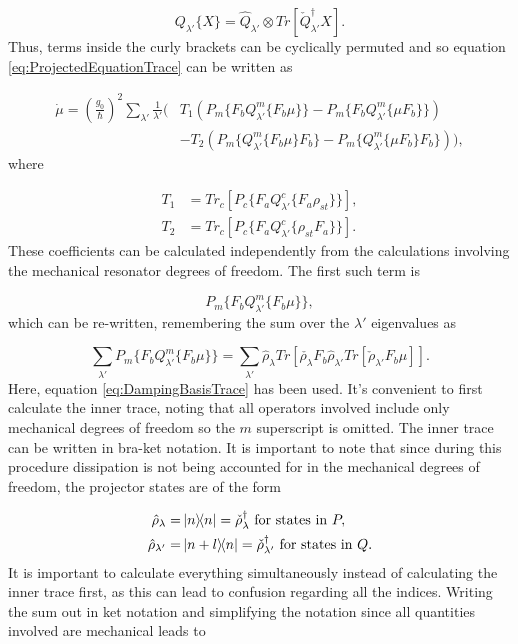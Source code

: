 \documentclass[12pt]{article}
\begin{document}
\begin{equation}\label{eq:DampingBasisTrace}
    Q_{\lambda'}\{X\} = \hat{Q}_{\lambda'}\otimes Tr[\check{Q}^\dagger_{\lambda'}X].
\end{equation} Thus, terms inside the curly brackets can be cyclically permuted and so equation \eqref{eq:ProjectedEquationTrace} can be written as

\begin{align*}
    \dot{\mu} = (\frac{g_0 }{\hbar})^2 \sum_{\lambda'}\frac{1}{\lambda'}\Bigg(& T_1(P_m\{F_b Q^m_{\lambda'}\{F_b\mu\}\}-P_m\{F_b Q^m_{\lambda'}\{\mu F_b\}\})\\
    &-T_2(P_m\{Q^m_{\lambda'}\{F_b\mu\}F_b\}-P_m\{Q^m_{\lambda'}\{\mu F_b\}F_b\})\Bigg),
\end{align*} where

\begin{align}
    T_1 &= Tr_c[P_c\{F_a Q^c_{\lambda'}\{F_a \rho_{st}\}\}],\\
    T_2 &= Tr_c[P_c\{F_aQ^c_{\lambda'}\{\rho_{st}F_a \} \}].
\end{align} These coefficients can be calculated independently from the calculations involving the mechanical resonator degrees of freedom. The first such term is

$$
    P_m\{F_b Q^m_{\lambda'}\{F_b\mu\}\},
$$
which can be re-written, remembering the sum over the $\lambda'$ eigenvalues as

\begin{equation}
  \sum_{\lambda'}  P_m\{F_b Q^m_{\lambda'}\{F_b\mu\}\} = \sum_{\lambda'} \hat{\rho}_\lambda Tr[\check{\rho_\lambda} F_b \hat{\rho}_{\lambda'}Tr[\check{\rho}_{\lambda'}F_b \mu] ].
\end{equation} Here, equation \eqref{eq:DampingBasisTrace} has been used. It's convenient to first calculate the inner trace, noting that all operators involved include only mechanical degrees of freedom so the $m$ superscript is omitted. The inner trace can be written in bra-ket notation. It is important to note that since during this procedure dissipation is not being accounted for in the mechanical degrees of freedom, the projector states are of the form

\begin{align}
    \hat{\rho}_\lambda =& \ketbra{n}{n} = \check{\rho}_\lambda^\dagger\text{ for states in } P,\\
    \hat{\rho}_{\lambda'} =& \ketbra{n+l}{n}= \check{\rho}_{\lambda'}^\dagger\text{ for states in } Q.
\end{align} It is important to calculate everything simultaneously instead of calculating the inner trace first, as this can lead to confusion regarding all the indices. Writing the sum out in ket notation and simplifying the notation since all quantities involved are mechanical leads to
\end{document}
